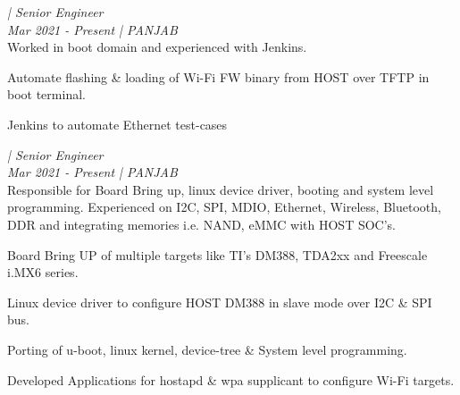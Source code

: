 %
%
%
%
{\large{\textit{\textbf{\CompanyA} | Senior Engineer}}}\\
{\small{\textit{Mar 2021 - Present | PANJAB}}} \\
\scriptsize{Worked in boot domain and experienced with Jenkins.}
\begin{itemize}
\footnotesize {
   \item \noindent Automate flashing \& loading of Wi-Fi FW binary from HOST over TFTP in boot terminal.
   \item \noindent Jenkins to automate Ethernet test-cases
}
\end{itemize}


%
%
%
%
{\large{\textit{\textbf{\CompanyA} | Senior Engineer}}}\\
{\small{\textit{Mar 2021 - Present | PANJAB}}} \\
\scriptsize{Responsible for Board Bring up, linux device driver, booting and system level programming. Experienced on I2C, SPI, MDIO, Ethernet, Wireless, Bluetooth, DDR and integrating memories i.e. NAND, eMMC with HOST SOC's.}
\begin{itemize}
\footnotesize {
   \item \noindent Board Bring UP of multiple targets like TI's DM388, TDA2xx and Freescale i.MX6 series.
   \item \noindent Linux device driver to configure HOST DM388 in slave mode over I2C \& SPI bus.
   \item \noindent Porting of u-boot, linux kernel, device-tree \& System level programming.
   \item \noindent Developed Applications for hostapd \& wpa supplicant to configure Wi-Fi targets. 
}
\end{itemize}
